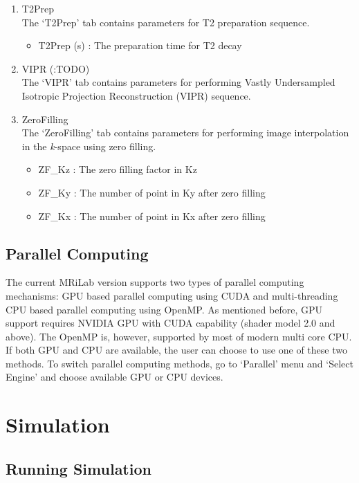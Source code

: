 \documentclass{book}%
\begin{document}
\begin{enumerate}
  \item T2Prep \\
	The `T2Prep' tab contains parameters for T2 preparation sequence.
		\begin{itemize}
			\item T2Prep (s) : The preparation time for T2 decay
		\end{itemize}
		
	\item VIPR (:TODO) \\
	The `VIPR' tab contains parameters for performing Vastly Undersampled Isotropic Projection Reconstruction (VIPR) sequence.
	
	\item ZeroFilling \\
	The `ZeroFilling' tab contains parameters for performing image interpolation in the \textit{k}-space using zero filling.
		\begin{itemize}
			\item ZF\_Kz : The zero filling factor in Kz
			\item ZF\_Ky : The number of point in Ky after zero filling
			\item ZF\_Kx : The number of point in Kx after zero filling
		\end{itemize}
	
\end{enumerate}

\section{Parallel Computing}

The current MRiLab version supports two types of parallel computing mechanisms: GPU based parallel computing using CUDA and multi-threading CPU based parallel computing using OpenMP. As mentioned before, GPU support requires NVIDIA GPU with CUDA capability (shader model 2.0 and above). The OpenMP is, however, supported by most of modern multi core CPU. If both GPU and CPU are available, the user can choose to use one of these two methods. To switch parallel computing methods, go to `Parallel' menu and `Select Engine' and choose available GPU or CPU devices.

\chapter{Simulation}

\section{Running Simulation}
\end{document}
